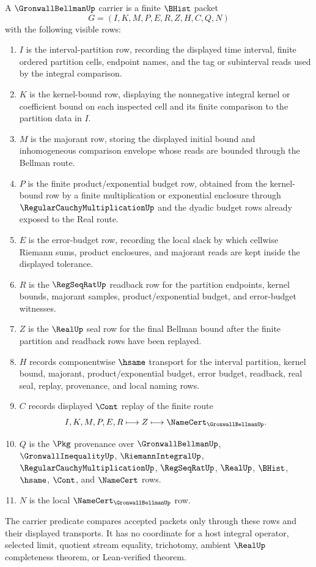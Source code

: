 \begin{definition}
\label{def:gronwall-bellman-carrier}
A $\GronwallBellmanUp$ carrier is a finite $\BHist$ packet
$$
G=(I,K,M,P,E,R,Z,H,C,Q,N)
$$
with the following visible rows:
\begin{enumerate}
\item $I$ is the interval-partition row, recording the displayed time interval, finite ordered partition cells, endpoint names, and the tag or subinterval reads used by the integral comparison.
\item $K$ is the kernel-bound row, displaying the nonnegative integral kernel or coefficient bound on each inspected cell and its finite comparison to the partition data in $I$.
\item $M$ is the majorant row, storing the displayed initial bound and inhomogeneous comparison envelope whose reads are bounded through the Bellman route.
\item $P$ is the finite product/exponential budget row, obtained from the kernel-bound row by a finite multiplication or exponential enclosure through $\RegularCauchyMultiplicationUp$ and the dyadic budget rows already exposed to the Real route.
\item $E$ is the error-budget row, recording the local slack by which cellwise Riemann sums, product enclosures, and majorant reads are kept inside the displayed tolerance.
\item $R$ is the $\RegSeqRatUp$ readback row for the partition endpoints, kernel bounds, majorant samples, product/exponential budget, and error-budget witnesses.
\item $Z$ is the $\RealUp$ seal row for the final Bellman bound after the finite partition and readback rows have been replayed.
\item $H$ records componentwise $\hsame$ transport for the interval partition, kernel bound, majorant, product/exponential budget, error budget, readback, real seal, replay, provenance, and local naming rows.
\item $C$ records displayed $\Cont$ replay of the finite route
$$
I,K,M,P,E,R \longmapsto Z \longmapsto \NameCert_{\GronwallBellmanUp}.
$$
\item $Q$ is the $\Pkg$ provenance over $\GronwallBellmanUp$, $\GronwallInequalityUp$, $\RiemannIntegralUp$, $\RegularCauchyMultiplicationUp$, $\RegSeqRatUp$, $\RealUp$, $\BHist$, $\hsame$, $\Cont$, and $\NameCert$ rows.
\item $N$ is the local $\NameCert_{\GronwallBellmanUp}$ row.
\end{enumerate}
The carrier predicate compares accepted packets only through these rows and their displayed transports. It has no coordinate for a host integral operator, selected limit, quotient stream equality, trichotomy, ambient $\RealUp$ completeness theorem, or Lean-verified theorem.
\end{definition}


